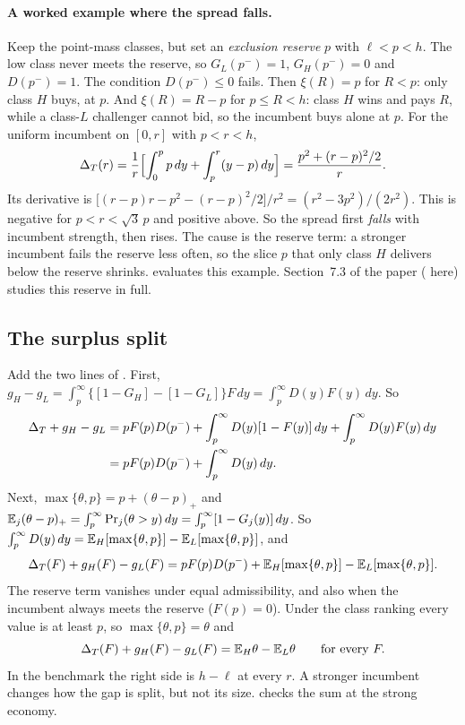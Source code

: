 \paragraph{A worked example where the spread falls.} Keep the point-mass classes, but set an
\emph{exclusion reserve} \(p\) with \(\ell<p<h\). The low class never meets the reserve, so \(G_L(p^-)=1\),
\(G_H(p^-)=0\) and \(D(p^-)=1\). The condition \(D(p^-)\le0\) fails. Then \(\xi(R)=p\) for \(R<p\): only
class \(H\) buys, at \(p\). And \(\xi(R)=R-p\) for \(p\le R<h\): class \(H\) wins and pays \(R\), while a
class-\(L\) challenger cannot bid, so the incumbent buys alone at \(p\). For the uniform incumbent on
\([0,r]\) with \(p<r<h\),
\[
\Delta_T(r)=\frac1r\Bigl[\int_0^p p\,dy+\int_p^r(y-p)\,dy\Bigr]=\frac{p^2+(r-p)^2/2}{r}.
\]
Its derivative is \(\bigl[(r-p)r-p^2-(r-p)^2/2\bigr]/r^2=(r^2-3p^2)/(2r^2)\). This is negative for
\(p<r<\sqrt3\,p\) and positive above. So the spread first \emph{falls} with incumbent strength, then rises.
The cause is the reserve term: a stronger incumbent fails the reserve less often, so the slice \(p\) that
only class \(H\) delivers below the reserve shrinks.  evaluates this example.
Section~7.3 of the paper ( here) studies this reserve in full.

\subsection{The surplus split}\label{sec:03_auction-split}

Add the two lines of . First, \(g_H-g_L=\int_p^\infty\{[1-G_H]-[1-G_L]\}F\,dy
=\int_p^\infty D(y)F(y)\,dy\). So
\begin{align*}
\Delta_T+g_H-g_L&=pF(p)D(p^-)+\int_p^\infty D(y)[1-F(y)]\,dy+\int_p^\infty D(y)F(y)\,dy\\
&=pF(p)D(p^-)+\int_p^\infty D(y)\,dy.
\end{align*}
Next, \(\max\{\theta,p\}=p+(\theta-p)_+\) and \(\mathbb{E}_j(\theta-p)_+=\int_p^\infty\Pr_j(\theta>y)\,dy
=\int_p^\infty[1-G_j(y)]\,dy\). So \(\int_p^\infty D(y)\,dy=\mathbb{E}_H[\max\{\theta,p\}]-\mathbb{E}_L[\max\{\theta,p\}]\),
and
\[
\Delta_T(F)+g_H(F)-g_L(F)=pF(p)D(p^-)+\mathbb{E}_H[\max\{\theta,p\}]-\mathbb{E}_L[\max\{\theta,p\}].
\]
The reserve term vanishes under equal admissibility, and also when the incumbent always meets the reserve
(\(F(p)=0\)). Under the class ranking every value is at least \(p\), so \(\max\{\theta,p\}=\theta\) and
\[
\Delta_T(F)+g_H(F)-g_L(F)=\mathbb{E}_H\theta-\mathbb{E}_L\theta\qquad\text{for every }F.
\]
In the benchmark the right side is \(h-\ell\) at every \(r\). A stronger incumbent changes how the
gap is split, but not its size.  checks the sum at the strong economy.

